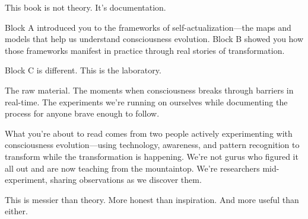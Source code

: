 \documentclass[12pt,openany]{book}
\begin{document}
\vspace{0.4in}

\noindent This book is not theory. It's documentation.

Block A introduced you to the frameworks of self-actualization—the maps and models that help us understand consciousness evolution. Block B showed you how those frameworks manifest in practice through real stories of transformation.

Block C is different. This is the laboratory.

The raw material. The moments when consciousness breaks through barriers in real-time. The experiments we're running on ourselves while documenting the process for anyone brave enough to follow.

What you're about to read comes from two people actively experimenting with consciousness evolution—using technology, awareness, and pattern recognition to transform while the transformation is happening. We're not gurus who figured it all out and are now teaching from the mountaintop. We're researchers mid-experiment, sharing observations as we discover them.

This is messier than theory. More honest than inspiration. And more useful than either.

\end{document}
